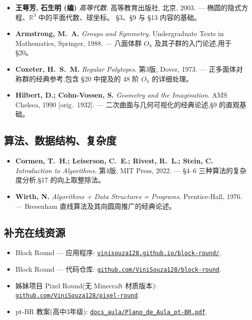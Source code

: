 \documentclass[12pt,a4paper]{scrartcl}
\newcommand{\biblink}[2]{\href{#1}{\nolinkurl{#2}}}
\begin{document}
\begin{itemize}[leftmargin=1.4em,itemsep=0.3em,topsep=0.3em]
  \item \textbf{王萼芳, 石生明 (编)} \emph{高等代数}. 高等教育出版社, 北京, 2003.
        --- 椭圆的隐式方程、$\mathbb{R}^3$ 中的平面代数、球坐标。
        §3、§9 与 §13 内容的基础。

  \item \textbf{Armstrong, M.~A.} \emph{Groups and Symmetry}. Undergraduate Texts in
        Mathematics, Springer, 1988.
        --- 八面体群 $O_h$ 及其子群的入门论述,用于 §20。

  \item \textbf{Coxeter, H.~S.~M.} \emph{Regular Polytopes}. 第3版, Dover, 1973.
        --- 正多面体对称群的经典参考,包含 §20 中提及的 48 阶 $O_h$ 的详细处理。

  \item \textbf{Hilbert, D.; Cohn-Vossen, S.} \emph{Geometry and the Imagination}.
        AMS Chelsea, 1990 [orig.~1932].
        --- 二次曲面与几何可视化的经典论述,§9 的直观基础。
\end{itemize}

\subsection*{算法、数据结构、复杂度}

\begin{itemize}[leftmargin=1.4em,itemsep=0.3em,topsep=0.3em]
  \item \textbf{Cormen, T.~H.; Leiserson, C.~E.; Rivest, R.~L.; Stein, C.}
        \emph{Introduction to Algorithms}. 第4版, MIT Press, 2022.
        --- §4--6 三种算法的复杂度分析,§17 的向上取整除法。

  \item \textbf{Wirth, N.} \emph{Algorithms + Data Structures = Programs}.
        Prentice-Hall, 1976.
        --- Bresenham 直线算法及其向圆周推广的经典论述。
\end{itemize}

\subsection*{补充在线资源}

\begin{itemize}[leftmargin=1.4em,itemsep=0.3em,topsep=0.3em]
  \item Block Round --- 应用程序: \biblink{https://vinisouza128.github.io/block-round/}{vinisouza128.github.io/block-round/}.
  \item Block Round --- 代码仓库: \biblink{https://github.com/ViniSouza128/block-round}{github.com/ViniSouza128/block-round}.
  \item 姊妹项目 Pixel Round(无 Minecraft 材质版本):
        \biblink{https://github.com/ViniSouza128/pixel-round}{github.com/ViniSouza128/pixel-round}.
  \item pt-BR 教案(高中3年级):
        \biblink{https://vinisouza128.github.io/block-round/docs_aula/Plano_de_Aula_pt-BR.pdf}{docs\_aula/Plano\_de\_Aula\_pt-BR.pdf}.
\end{itemize}
\end{document}
